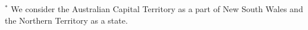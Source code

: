 \documentclass[12pt]{article}
\theoremstyle{definition}
\begin{document}
\begin{table}[!hb]
{\begin{tabular}{lllllllllll}
			\bottomrule
		\end{tabular}
	}
\fontsize{8}{9}\selectfont
$^*$ We consider the Australian Capital Territory as a part of New South Wales and the Northern Territory as a state.
\end{table}




\end{document}
